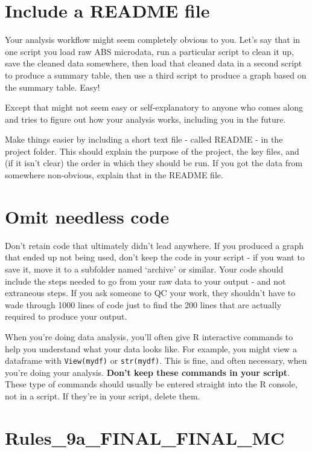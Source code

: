 \documentclass[]{book}
\begin{document}
\hypertarget{README}{%
\section{Include a README file}\label{README}}

Your analysis workflow might seem completely obvious to you. Let's say that in one script you load raw ABS microdata, run a particular script to clean it up, save the cleaned data somewhere, then load that cleaned data in a second script to produce a summary table, then use a third script to produce a graph based on the summary table. Easy!

Except that might not seem easy or self-explanatory to anyone who comes along and tries to figure out how your analysis works, including you in the future.

Make things easier by including a short text file - called README - in the project folder. This should explain the purpose of the project, the key files, and (if it isn't clear) the order in which they should be run. If you got the data from somewhere non-obvious, explain that in the README file.

\hypertarget{omit-needless-code}{%
\section{Omit needless code}\label{omit-needless-code}}

Don't retain code that ultimately didn't lead anywhere. If you produced a graph that ended up not being used, don't keep the code in your script - if you want to save it, move it to a subfolder named `archive' or similar. Your code should include the steps needed to go from your raw data to your output - and not extraneous steps. If you ask someone to QC your work, they shouldn't have to wade through 1000 lines of code just to find the 200 lines that are actually required to produce your output.

When you're doing data analysis, you'll often give R interactive commands to help you understand what your data looks like. For example, you might view a dataframe with \texttt{View(mydf)} or \texttt{str(mydf)}. This is fine, and often necessary, when you're doing your analysis. \textbf{Don't keep these commands in your script}. These type of commands should usually be entered straight into the R console, not in a script. If they're in your script, delete them.

\hypertarget{rules_9a_final_final_mc}{%
\section{Rules\_9a\_FINAL\_FINAL\_MC}\label{rules_9a_final_final_mc}}
\end{document}
